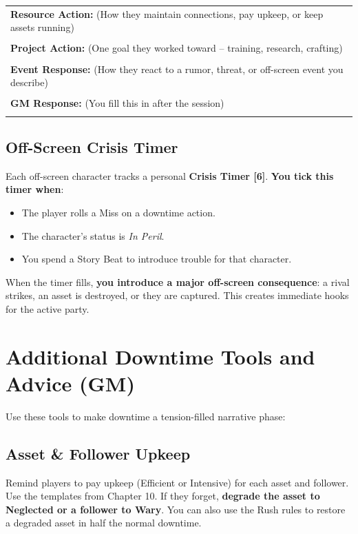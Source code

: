 \begin{tcolorbox}[colback=gray!5!white, colframe=black, title=Downtime Log -- \_\_\_\_\_\_\_\_\_ (Character Name),breakable]
\begin{tabular}{p{}}
\textbf{Resource Action:} (How they maintain connections, pay upkeep, or keep assets running) \\
\rule{0pt}{4ex}\\
\textbf{Project Action:} (One goal they worked toward -- training, research, crafting) \\
\rule{0pt}{4ex}\\
\textbf{Event Response:} (How they react to a rumor, threat, or off-screen event you describe) \\
\rule{0pt}{4ex}\\
\textbf{GM Response:} (You fill this in after the session) \\
\rule{0pt}{4ex}
\end{tabular}
\end{tcolorbox}

\subsection{Off-Screen Crisis Timer }
Each off-screen character tracks a personal \textbf{Crisis Timer [6]}. \textbf{You tick this timer when}:  
\begin{itemize}
  \item The player rolls a Miss on a downtime action. 
  \item The character's status is \textit{In Peril}. 
  \item You spend a Story Beat to introduce trouble for that character. 
\end{itemize}
When the timer fills, \textbf{you introduce a major off-screen consequence}: a rival strikes, an asset is destroyed, or they are captured. This creates immediate hooks for the active party. 

\section{Additional Downtime Tools and Advice (GM)}
\label{sec:downtime-advice}
Use these tools to make downtime a tension-filled narrative phase:  

\subsection{Asset \& Follower Upkeep}
Remind players to pay upkeep (Efficient or Intensive) for each asset and follower. Use the templates from Chapter 10. If they forget, \textbf{degrade the asset to Neglected or a follower to Wary}. You can also use the Rush rules to restore a degraded asset in half the normal downtime. 

